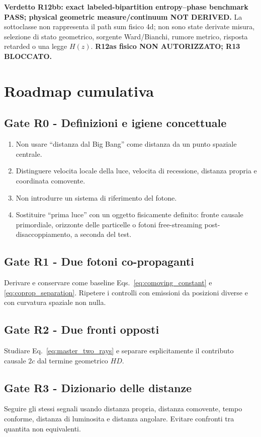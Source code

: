 \documentclass[11pt,a4paper]{article}
\begin{document}
\textbf{Verdetto R12bb: exact labeled-bipartition entropy--phase benchmark PASS; physical geometric measure/continuum NOT DERIVED.} La sottoclasse non rappresenta il path sum fisico 4d; non sono state derivate misura, selezione di stato geometrico, sorgente Ward/Bianchi, rumore metrico, risposta retarded o una legge $H(z)$. \textbf{R12as fisico NON AUTORIZZATO; R13 BLOCCATO.}


\section{Roadmap cumulativa}

\subsection*{Gate R0 - Definizioni e igiene concettuale}
\begin{enumerate}[label=R0.\arabic*]
\item Non usare ``distanza dal Big Bang'' come distanza da un punto spaziale centrale.
\item Distinguere velocita locale della luce, velocita di recessione, distanza propria e coordinata comovente.
\item Non introdurre un sistema di riferimento del fotone.
\item Sostituire ``prima luce'' con un oggetto fisicamente definito: fronte causale primordiale, orizzonte delle particelle o fotoni free-streaming post-disaccoppiamento, a seconda del test.
\end{enumerate}

\subsection*{Gate R1 - Due fotoni co-propaganti}
Derivare e conservare come baseline Eqs.~\eqref{eq:comoving_constant} e \eqref{eq:coprop_separation}. Ripetere i controlli con emissioni da posizioni diverse e con curvatura spaziale non nulla.

\subsection*{Gate R2 - Due fronti opposti}
Studiare Eq.~\eqref{eq:master_two_rays} e separare esplicitamente il contributo causale $2c$ dal termine geometrico $HD$.

\subsection*{Gate R3 - Dizionario delle distanze}
Seguire gli stessi segnali usando distanza propria, distanza comovente, tempo conforme, distanza di luminosita e distanza angolare. Evitare confronti tra quantita non equivalenti.
\end{document}
